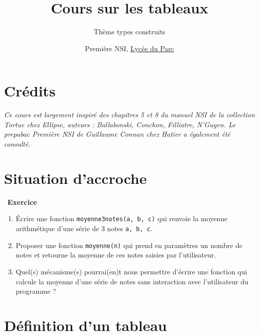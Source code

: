\documentclass[
  11pt,
]{article}
\title{Cours sur les tableaux}
\subtitle{Thème types construits}
\author{Première NSI, \href{https://frederic-junier.org/}{Lycée du
Parc}}
\date{}
\newcommand{\passthrough}[1]{#1}
\providecommand{\tightlist}{%
  \setlength{\itemsep}{0pt}\setlength{\parskip}{0pt}}
\newcounter{exo}
\newenvironment{exercice}[1]
{\par \medskip   \addtocounter{exo}{1} \noindent  
\begin{bclogo}[arrondi =0.1,   noborder = true, logo=\bccrayon, marge=4]{~\textbf{Exercice} \textbf{\theexo} {\itshape #1} }  \par}
{
\end{bclogo}
 \par \bigskip }
\newcounter{def}
\newcounter{cours}
\newcounter{prog}
\begin{document}
\maketitle

\renewcommand*\contentsname{Table des matières}
{
\hypersetup{linkcolor=}
\setcounter{tocdepth}{3}
\tableofcontents
}
\hypertarget{cruxe9dits}{%
\section*{Crédits}\label{cruxe9dits}}

\emph{Ce cours est largement inspiré des chapitres 5 et 8 du manuel NSI
de la collection Tortue chez Ellipse, auteurs : Ballabonski, Conchon,
Filliatre, N'Guyen. Le prepabac Première NSI de Guillaume Connan chez
Hatier a également été consulté.}

\newpage

\hypertarget{situation-daccroche}{%
\section{Situation d'accroche}\label{situation-daccroche}}

\begin{exercice}{}

\begin{enumerate}
\def\labelenumi{\arabic{enumi}.}
\tightlist
\item
  Écrire une fonction \passthrough{\lstinline!moyenne3notes(a, b, c)!}
  qui renvoie la moyenne arithmétique d'une série de 3 notes
  \passthrough{\lstinline!a, b, c!}.
\item
  Proposer une fonction \passthrough{\lstinline!moyenne(n)!} qui prend
  en paramètres un nombre de notes et retourne la moyenne de ces notes
  saisies par l'utilisateur.
\item
  Quel(s) mécanisme(s) pourrai(en)t nous permettre d'écrire une fonction
  qui calcule la moyenne d'une série de notes sans interaction avec
  l'utilisateur du programme ?
\end{enumerate}

\end{exercice}

\hypertarget{duxe9finition-dun-tableau}{%
\section{Définition d'un tableau}\label{duxe9finition-dun-tableau}}
\end{document}
